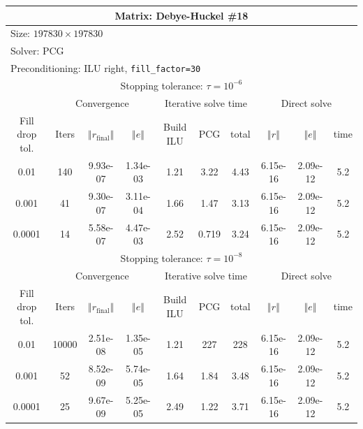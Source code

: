 \documentclass[oneside,final]{amsart}  %
\begin{document}
\begin{tabular}{|c|c|c|c|c|c|c|c|c|c|}
\hline
\multicolumn{10}{|c|}{Matrix: Debye-Huckel \#18}\tabularnewline
\hline
  \multicolumn{10}{|l|}{Size: $197830\times197830$}\tabularnewline
\hline
\multicolumn{10}{|l|}{Solver: PCG}\tabularnewline
\hline
\multicolumn{10}{|l|}{Preconditioning: ILU right, \texttt{fill\_factor=30}}\tabularnewline
\hline
\hline
\multicolumn{10}{|c|}{Stopping tolerance: $\tau=10^{-6}$}\tabularnewline
\hline
\hline
 & \multicolumn{3}{c|}{Convergence} & \multicolumn{3}{c|}{Iterative solve time} & \multicolumn{3}{c|}{Direct solve}\tabularnewline
\hline
Fill drop tol.  & Iters & $\left\Vert r_{\text{final}}\right\Vert $  & $\left\Vert e\right\Vert $  & Build ILU  & PCG  & total  & $\left\Vert r\right\Vert $ & $\left\Vert e\right\Vert $  & time\tabularnewline
\hline
  0.01 & 140 & 9.93e-07 & 1.34e-03 &       1.21 &       3.22 &       4.43 & 6.15e-16 & 2.09e-12 &        5.2\\
  \hline
  0.001 & 41 & 9.30e-07 & 3.11e-04 &       1.66 &       1.47 &       3.13 & 6.15e-16 & 2.09e-12 &        5.2\\
  \hline
  0.0001 & 14 & 5.58e-07 & 4.47e-03 &       2.52 &      0.719 &       3.24 & 6.15e-16 & 2.09e-12 &        5.2\\
  \hline
\hline
\multicolumn{10}{|c|}{Stopping tolerance: $\tau=10^{-8}$}\tabularnewline
\hline
\hline
 & \multicolumn{3}{c|}{Convergence} & \multicolumn{3}{c|}{Iterative solve time} & \multicolumn{3}{c|}{Direct solve }\tabularnewline
\hline
Fill drop tol.  & Iters  & $\left\Vert r_{\text{final}}\right\Vert $  & $\left\Vert e\right\Vert $ & Build ILU  & PCG  & total  & $\left\Vert r\right\Vert $  & $\left\Vert e\right\Vert $  & time\tabularnewline
\hline
  0.01 & 10000 & 2.51e-08 & 1.35e-05 &       1.21 &        227 &        228 & 6.15e-16 & 2.09e-12 &        5.2\\
  \hline
  0.001 & 52 & 8.52e-09 & 5.74e-05 &       1.64 &       1.84 &       3.48 & 6.15e-16 & 2.09e-12 &        5.2\\
  \hline
  0.0001 & 25 & 9.67e-09 & 5.25e-05 &       2.49 &       1.22 &       3.71 & 6.15e-16 & 2.09e-12 &        5.2\\
  \hline
\end{tabular}
\end{document}
